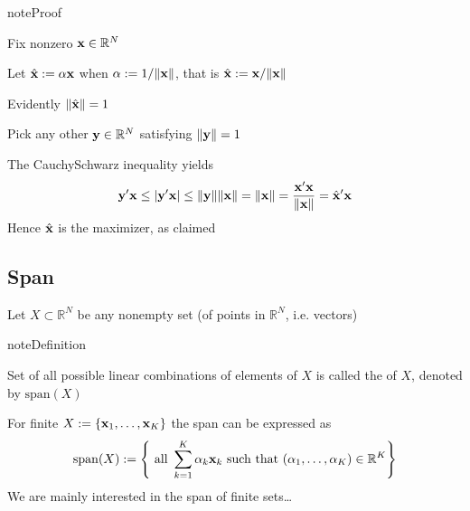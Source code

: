 \documentclass[letterpaper,10pt,english]{jupyterBook}
\begin{document}
\begin{sphinxadmonition}{note}{Proof}

\sphinxAtStartPar
Fix nonzero \({\bf x} \in \mathbb{R}^N\)

\sphinxAtStartPar
Let \({\hat{\bf x}} := \alpha {\bf x}\) when \(\alpha := 1/\|{\bf x}\|\), that is \({\hat{\bf x}} := {\bf x} / \| {\bf x} \|\)

\sphinxAtStartPar
Evidently \(\| {\hat{\bf x}} \| = 1\)

\sphinxAtStartPar
Pick any other \({\bf y} \in \mathbb{R}^N\) satisfying \(\| {\bf y} \| = 1\)

\sphinxAtStartPar
The Cauchy\sphinxhyphen{}Schwarz inequality yields
\begin{equation*}
\begin{split}
%
{\bf y}' {\bf x}
\leq |{\bf y}' {\bf x}|
\leq \| {\bf y} \| \| {\bf x} \|
= \| {\bf x} \|
= \frac{{\bf x}' {\bf x}}{ \| {\bf x} \| }
= {\hat{\bf x}}' {\bf x}
%
\end{split}
\end{equation*}
\sphinxAtStartPar
Hence \({\hat{\bf x}}\) is the maximizer, as claimed
\end{sphinxadmonition}


\subsection{Span}
\label{\detokenize{05.linear_algebra:span}}
\sphinxAtStartPar
Let \(X \subset \mathbb{R}^N\) be any nonempty set (of points in \(\mathbb{R}^N\), i.e. vectors)

\begin{sphinxadmonition}{note}{Definition}

\sphinxAtStartPar
Set of all possible linear combinations of elements of \(X\) is
called the  of \(X\), denoted by \(\mathrm{span}(X)\)
\end{sphinxadmonition}

\sphinxAtStartPar
For finite \(X := \{{\bf x}_1,\ldots, {\bf x}_K\}\) the span can be expressed
as
\begin{equation*}
\begin{split}
\mathrm{span}(X):= \left\{ \text{ all } \sum_{k=1}^K \alpha_k {\bf x}_k 
\text{ such that }
(\alpha_1,\ldots, \alpha_K) \in \mathbb{R}^K \right\}
\end{split}
\end{equation*}
\sphinxAtStartPar
We are mainly interested in the span of finite sets…
\end{document}
